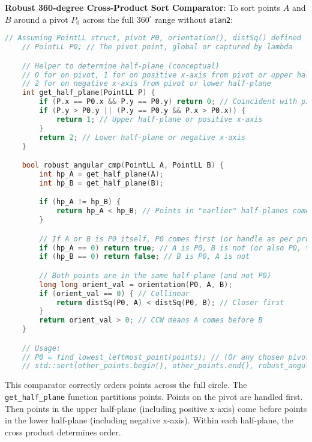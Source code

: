 \begin{implementation}
\label{impl:A.4.2.full_360_cross_product_sort}
\textbf{Robust 360-degree Cross-Product Sort Comparator}:
To sort points $A$ and $B$ around a pivot $P_0$ across the full $360^\circ$ range without \texttt{atan2}:
\begin{lstlisting}[language=C++, caption=Full 360 degree angular sort comparator (C++)]
    // Assuming PointLL struct, pivot P0, orientation(), distSq() defined
    // PointLL P0; // The pivot point, global or captured by lambda

    // Helper to determine half-plane (conceptual)
    // 0 for on pivot, 1 for on positive x-axis from pivot or upper half-plane,
    // 2 for on negative x-axis from pivot or lower half-plane
    int get_half_plane(PointLL P) {
        if (P.x == P0.x && P.y == P0.y) return 0; // Coincident with pivot
        if (P.y > P0.y || (P.y == P0.y && P.x > P0.x)) {
            return 1; // Upper half-plane or positive x-axis
        }
        return 2; // Lower half-plane or negative x-axis
    }

    bool robust_angular_cmp(PointLL A, PointLL B) {
        int hp_A = get_half_plane(A);
        int hp_B = get_half_plane(B);

        if (hp_A != hp_B) {
            return hp_A < hp_B; // Points in "earlier" half-planes come first
        }

        // If A or B is P0 itself, P0 comes first (or handle as per problem)
        if (hp_A == 0) return true; // A is P0, B is not (or also P0, then equal)
        if (hp_B == 0) return false; // B is P0, A is not

        // Both points are in the same half-plane (and not P0)
        long long orient_val = orientation(P0, A, B);
        if (orient_val == 0) { // Collinear
            return distSq(P0, A) < distSq(P0, B); // Closer first
        }
        return orient_val > 0; // CCW means A comes before B
    }

    // Usage:
    // P0 = find_lowest_leftmost_point(points); // (Or any chosen pivot)
    // std::sort(other_points.begin(), other_points.end(), robust_angular_cmp);
\end{lstlisting}

This comparator correctly orders points across the full circle.
The \texttt{get\_half\_plane} function partitions points.
Points on the pivot are handled first.
Then points in the upper half-plane (including positive x-axis)
come before points in the lower half-plane (including negative x-axis).
Within each half-plane, the cross product determines order.
\end{implementation}
